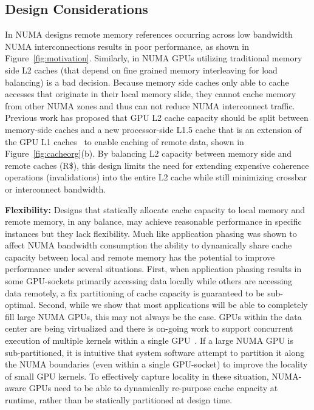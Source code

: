 \subsection{Design Considerations}
In NUMA designs remote memory references occurring across low bandwidth NUMA 
interconnections results in poor performance, as shown in 
Figure~\ref{fig:motivation}. Similarly, in NUMA GPUs utilizing
traditional memory side L2 caches (that depend on fine grained memory 
interleaving for load balancing) is a bad decision. Because memory side caches only
able to cache accesses that originate in their local memory slide, they cannot
cache memory from other NUMA zones and thus can not reduce NUMA interconnect traffic.  
Previous work has proposed that GPU L2 cache capacity should be split between 
memory-side caches and a new processor-side L1.5 cache that is an extension 
of the GPU L1 caches~\cite{Arunkumar2017} to enable caching of remote data, shown
in Figure~\ref{fig:cacheorg}(b). By balancing L2 capacity between memory side 
and remote caches (R\$), this design limits the need for extending expensive coherence
operations (invalidations) into the entire L2 cache while still 
minimizing crossbar or interconnect bandwidth.

\textbf{Flexibility:} Designs that statically allocate cache capacity to local memory and remote memory, 
in any balance, may achieve reasonable performance in specific instances 
but they lack flexibility. Much like application phasing was shown to affect 
NUMA bandwidth consumption the ability to dynamically share cache capacity between local and 
remote memory has the potential to improve performance under several 
situations. First, when application phasing results in some GPU-sockets
primarily accessing data locally while others are accessing data remotely,
a fix partitioning of cache capacity is guaranteed to be sub-optimal.
Second, while 
we show that most applications will be able to completely fill large 
NUMA GPUs, this may not always be the case. GPUs within the data center are 
being virtualized and there is on-going work to support concurrent execution 
of multiple kernels within a single GPU~\cite{park2015chimera, 
lin2016enabling}. If a large NUMA GPU is sub-partitioned, it is intuitive 
that system software attempt to partition it along the NUMA boundaries (even within
a single GPU-socket) to improve the locality of small GPU kernels.
To effectively  capture locality in these situation, NUMA-aware GPUs need to be able to 
dynamically re-purpose cache capacity at runtime, rather than be statically partitioned at design time. 

